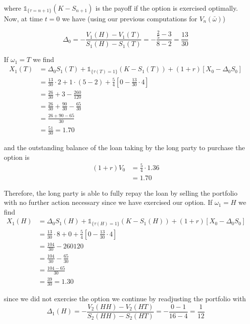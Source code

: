 \documentclass[12pt]{article}
\newlength\tindent
\renewcommand{\indent}{\hspace*{\tindent}}
\begin{document}
where $\mathds 1_{\{ \tau = n + 1\}}(K - S_{n + 1})$ is the payoff if the option is exercised optimally. Now, at time $t = 0$ we have (using our previous computations for $V_n(\bar{\omega})$)

\begin{equation*}
	\Delta_0 = -\frac{ V_1(H) - V_1(T) }{ S_1(H) - S_1(T) } = - \frac{ \frac{2}{5} - 3 }{ 8 - 2 } = \frac{13}{30}
\end{equation*}

If $\omega_1 = T$ we find
\begin{align*}
	X_1(T) &= \Delta_0S_1(T) + \mathds 1_{\{ \tau(T) = 1\}}(K - S_1(T)) + (1 + r)[X_0 - \Delta_0S_0] \\
	&= \frac{13}{30}\cdot 2 + 1 \cdot (5 - 2) + \frac{5}{4}\left[ 0 - \frac{13}{30}\cdot 4\right] \\
	&= \frac{26}{30} + 3 - \frac{260}{120} \\
	&= \frac{26}{30} + \frac{90}{30} - \frac{65}{30} \\
	&= \frac{26 + 90 - 65}{30} \\
	&= \frac{51}{30} = 1.70
\end{align*}

and the outstanding balance of the loan taking by the long party to purchase the option is
\begin{align*}
	(1 + r)V_0 &= \frac{5}{4}\cdot1.36 \\
	&= 1.70
\end{align*}

\indent Therefore, the long party is able to fully repay the loan by selling the portfolio with no further action necessary since we have exercised our option. If $\omega_1 = H$ we find
\begin{align*}
	X_1(H) &= \Delta_0S_1(H) + \mathds 1_{\{ \tau(H) = 1\}}(K - S_1(H)) + (1 + r)[X_0 - \Delta_0S_0] \\
	&= \frac{13}{30} \cdot 8 + 0 + \frac{5}{4}\left[ 0 - \frac{13}{30}\cdot 4 \right] \\
	&= \frac{104}{30} - {260}{120} \\
	&= \frac{104}{30} - \frac{65}{30} \\
	&= \frac{104 - 65}{30} \\
	&= \frac{39}{30} = 1.30
\end{align*}

since we did not exercise the option we continue by readjusting the portfolio with
\begin{equation*}
	\Delta_1(H) = -\frac{ V_2(HH) - V_2(HT) }{ S_2(HH) - S_2(HT) } = - \frac{0 - 1}{16 - 4} = \frac{1}{12}
\end{equation*}
\end{document}
